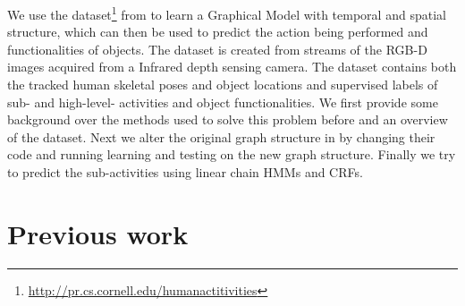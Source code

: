 \documentclass{article} %
\begin{document}
We use the  dataset\footnote{\url{http://pr.cs.cornell.edu/humanactitivities}} from \cite{koppula2013detectingactivitiesrgbd}
 to learn a Graphical Model with temporal and spatial structure, which can then be used to predict the action being performed and functionalities of objects. The dataset is created from streams of the RGB-D images acquired from a Infrared depth sensing camera. The dataset contains both the tracked human skeletal poses and object locations and supervised labels of sub- and high-level- activities and object functionalities. We first provide some background over the methods used to solve this problem before and an overview of the dataset. Next we alter the original graph structure in \cite{koppula2013detectingactivitiesrgbd} by changing their code and running learning and testing on the new graph structure. Finally we try to predict the sub-activities using linear chain HMMs and CRFs.
 
 
\section{Previous work} 
\end{document}
